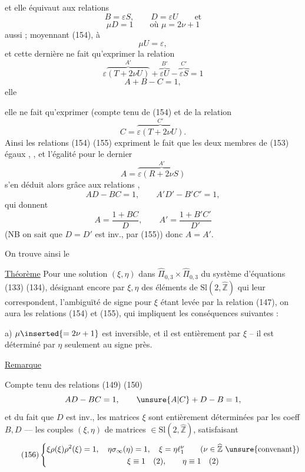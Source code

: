 
et elle équivaut aux relations
\[
\tag{154}
B=\varepsilon S,\qquad D=\varepsilon U\qquad\text{et}
\]
\[
\tag{155}
\mu D=1\qquad\text{où }\mu=2\nu+1
\]
 aussi ; moyennant (154), à
\[
\tag{155bis}
\mu U=\varepsilon,
\]
et cette dernière ne fait qu'exprimer  la relation
\[
\varepsilon\overbrace{(T+2\nu U)}^{A'}
+\overbrace{\varepsilon U}^{B'}-\overbrace{\varepsilon S}^{C'}=1
\]
\[
A+B-C=1,
\]
elle


elle ne fait qu'exprimer (compte tenu de (154) et de  la relation
\[
C=\overbrace{\varepsilon(T+2\nu U)}^{C'}.
\]
Ainsi les relations (154) (155) expriment le fait que les deux membres de (153)   égaux  , , et l'égalité pour le dernier
\[
A=\overbrace{\varepsilon(R+2\nu S)}^{A'}
\]
s'en déduit alors grâce aux relations , 
\[
AD-BC=1,\qquad A'D'-B'C'=1,
\]
qui donnent
\[
A=\frac{1+BC}{D},\qquad A'=\frac{1+B'C'}{D'}
\]
(NB on sait que $D=D'$ est inv., par (155)) donc $A=A'$.

On trouve ainsi le

\uline{Théorème} Pour une solution $(\xi,\eta)$ dans $\widehat{\Pi}_{0,3}\times\widehat{\Pi}_{0,3}$ du système d'équations (133) (134), désignant encore par $\xi,\eta$ des éléments de $\mathrm{Sl}(2,\widehat{\mathbb Z})$ qui leur correspondent, l'ambiguïté de signe pour $\xi$ étant levée par la relation (147), on aura les relations (154) et (155), qui impliquent les conséquences suivantes :

a) $\mu\inserted{=2\nu+1}$ est inversible, et il est entièrement  par $\xi$ -- il est déterminé par $\eta$ seulement au signe près.


\uline{Remarque}\par\nobreak
Compte tenu des relations (149) (150)
\[
AD-BC=1,\qquad \unsure{A|C}+D-B=1,
\]
et du fait que $D$ est inv., les matrices $\xi$ sont entièrement déterminées par les coeff $B,D$ --- les couples $(\xi,\eta)$ de matrices $\in\mathrm{Sl}(2,\widehat{\mathbb Z})$, satisfaisant
\[
\tag{156}
\left\{\begin{gathered}
\xi\rho(\xi)\rho^2(\xi)=1,\quad
\eta\sigma_\infty(\eta)=1,\quad
\xi=\eta\ell_1^\nu
\qquad(\nu\in\widehat{\mathbb Z}\ \text{\unsure{convenant}})\\
\xi\equiv1\quad(2),\qquad\eta\equiv1\quad(2)
\end{gathered}\right.
\]

